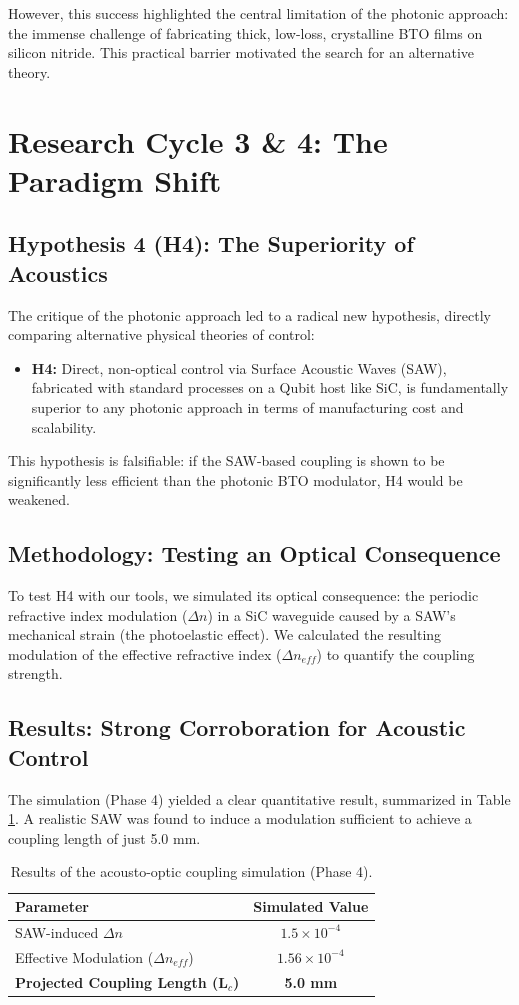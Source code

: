 \documentclass[conference]{IEEEtran} %
\begin{document}
However, this success highlighted the central limitation of the photonic approach: the immense challenge of fabricating thick, low-loss, crystalline BTO films on silicon nitride. This practical barrier motivated the search for an alternative theory.

\section{Research Cycle 3 \& 4: The Paradigm Shift}
\subsection{Hypothesis 4 (H4): The Superiority of Acoustics}
The critique of the photonic approach led to a radical new hypothesis, directly comparing alternative physical theories of control:
\begin{itemize}
    \item \textbf{H4:} Direct, non-optical control via Surface Acoustic Waves (SAW), fabricated with standard processes on a Qubit host like SiC, is fundamentally superior to any photonic approach in terms of manufacturing cost and scalability.
\end{itemize}
This hypothesis is falsifiable: if the SAW-based coupling is shown to be significantly less efficient than the photonic BTO modulator, H4 would be weakened.

\subsection{Methodology: Testing an Optical Consequence}
To test H4 with our tools, we simulated its optical consequence: the periodic refractive index modulation ($\Delta n$) in a SiC waveguide caused by a SAW's mechanical strain (the photoelastic effect). We calculated the resulting modulation of the effective refractive index ($\Delta n_{eff}$) to quantify the coupling strength.

\subsection{Results: Strong Corroboration for Acoustic Control}
The simulation (Phase 4) yielded a clear quantitative result, summarized in Table \ref{tab:cycle4}. A realistic SAW was found to induce a modulation sufficient to achieve a coupling length of just 5.0 mm.

\begin{table}[H]
\caption{Results of the acousto-optic coupling simulation (Phase 4).}
\label{tab:cycle4}
\centering
\begin{tabular}{lc}
\toprule
\textbf{Parameter} & \textbf{Simulated Value} \\
\midrule
SAW-induced $\Delta n$ & $1.5 \times 10^{-4}$ \\
Effective Modulation ($\Delta n_{eff}$) & $1.56 \times 10^{-4}$ \\
\textbf{Projected Coupling Length (L$_c$)} & \textbf{5.0 mm} \\
\bottomrule
\end{tabular}
\end{table}
\end{document}
